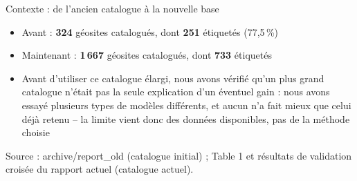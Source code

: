 \documentclass[11pt,aspectratio=169]{beamer}
\newcommand{\source}[1]{{\tiny\color{graytext}#1}}
\begin{document}
\begin{frame}{Contexte : de l'ancien catalogue \`a la nouvelle base}
  \begin{itemize}
    \setlength\itemsep{0.8em}
    \item Avant : \textbf{324} g\'eosites catalogu\'es, dont \textbf{251} \'etiquet\'es (77,5\,\%)
    \item Maintenant : \textbf{1\,667} g\'eosites catalogu\'es, dont \textbf{733} \'etiquet\'es
    \item Avant d'utiliser ce catalogue \'elargi, nous avons v\'erifi\'e qu'un plus
      grand catalogue n'\'etait pas la seule explication d'un \'eventuel gain : nous
      avons essay\'e plusieurs types de mod\`eles diff\'erents, et aucun n'a fait mieux
      que celui d\'ej\`a retenu -- la limite vient donc des donn\'ees disponibles, pas
      de la m\'ethode choisie
  \end{itemize}
  \vfill
  \source{Source : archive/report\_old (catalogue initial) ; Table 1 et r\'esultats de
  validation crois\'ee du rapport actuel (catalogue actuel).}
\end{frame}
\end{document}
